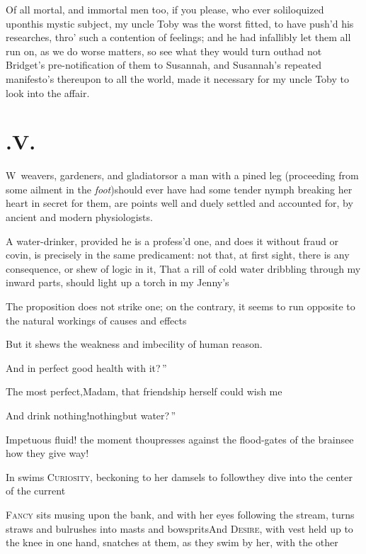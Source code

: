 \documentclass{article}
\begin{document}
Of all mortal, and immortal men too, if you please, who ever soliloquized upon\pb this
mystic subject, my uncle Toby was the worst fitted, to have push’d his researches,
thro’ such a contention of feelings; and he had infallibly let them all run on, as
we do worse matters, so see what they would turn out\tsh had not Bridget’s
pre-notification of them to\break
Susannah, and Susannah’s repeated manifesto’s thereupon
to all the world, made it necessary for my uncle Toby to look into the affair.

\newpage
\section{.\enspace V.}

\lettrine{W}{\,} weavers, gardeners, and
gla\-diators\tsk or a man with a pined leg (proceeding from some
ailment in\break
the \textit{foot})\tsk should ever have had some tender
nymph breaking her heart in secret for them, are points well and
duely settled and accounted for, by ancient and modern
physiologists.

A water-drinker, provided he is a profess’d one, and does
it without fraud or covin, is precisely in the same predicament:
not that, at first sight, there is any consequence, or shew of
logic in it,\break
\lqq That a rill of cold water dribbling\break
\lqq through my inward parts, should light\break
\lqq up a torch in my Jenny’s\tsk

\newpage
\tsh The proposition does not strike one; on the
contrary, it seems to run opposite to the natural workings of causes and
effects\tsh

But it shews the weakness and imbecility of human reason.

\tsh \lqq And in perfect good health\break
\lqq with it?\,”

\tsk The most perfect,\tsk Madam, that\break
friendship herself could wish me\tsh

\tsk \lqq And drink nothing!\tsk nothing\break\lqq but water?\,”

\tsk Impetuous fluid! the moment thou\break presses against the
flood-gates of the brain\tsk see how they give
way!\tsh

\newpage
In swims \textsc{Curiosity}, beckoning to her damsels to
follow\tsk they dive into the center of the
current\tsh

\textsc{Fancy} sits musing upon the bank, and with her
eyes following the stream, turns straws and bulrushes into masts
and bowsprits\tsh And \textsc{Desire}, with vest
held up to the knee in one hand, snatches at them, as they swim by
her, with the other\tsh
\end{document}
